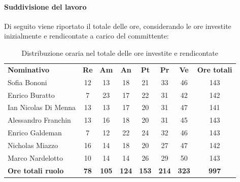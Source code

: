 \documentclass[../piano-di-progetto.tex]{subfiles}
\begin{document}
  \paragraph{Suddivisione del lavoro}
  Di seguito viene riportato il totale delle ore, considerando le ore investite inizialmente e rendicontate a carico del committente:
  \begin{table}[H]
    \centering
    \begin{tabular}{lccccccc}
      \rowcolor{lightgray}
      \textbf{Nominativo}        & \textbf{Re} & \textbf{Am}  & \textbf{An} & \textbf{Pt}  & \textbf{Pr}   & \textbf{Ve} & \textbf{Ore totali} \\
    Sofia Bononi              & 12          & 13           & 18           & 21           & 33           & 46           & 143          \\
    Enrico Buratto            & 7           & 23           & 17           & 22           & 31           & 42           & 142          \\
    Ian Nicolas Di Menna      & 13          & 13           & 17           & 20           & 31           & 47           & 141          \\
    Alessandro Franchin       & 13          & 16           & 18           & 20           & 31           & 45           & 143          \\
    Enrico Galdeman           & 7           & 12           & 22           & 24           & 32           & 46           & 143          \\
    Nicholas Miazzo           & 16          & 14           & 18           & 20           & 27           & 47           & 142          \\
    Marco Nardelotto          & 10          & 14           & 14           & 26           & 29           & 50           & 143          \\
    \textbf{Ore totali ruolo} & \textbf{78} & \textbf{105} & \textbf{124} & \textbf{153} & \textbf{214} & \textbf{323} & \textbf{997}
    \end{tabular}
    \caption{Distribuzione oraria nel totale delle ore investite e rendicontate}
    \end{table}
\end{document}
